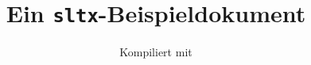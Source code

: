 \documentclass{sopra-paper}
\title{Ein \texttt{sltx}-Beispieldokument}
\subtitle{Kompiliert mit \thesopversion}
\begin{document}
\Blinddocument
\end{document}
